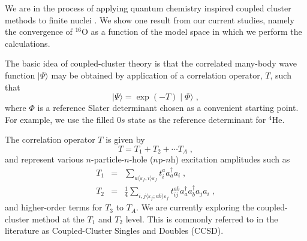 \documentclass[twoside,12pt]{article}
\begin{document}
We are in the process of applying quantum chemistry inspired coupled cluster
methods
\cite{comp_chem_rev00,cizek66,Bartlett95,Paldus99,Piecuch02a,Piecuch02b,cizek69,Stanton:1993,Piecuch99} to
finite nuclei \cite{dean03,kowalski03n}. We show one result
from our current studies, namely the convergence of $^{16}$O
as a function of the model space in which we perform the calculations.

The basic idea of coupled-cluster theory is that the correlated many-body
wave function $\mid \Psi\rangle$ 
may be obtained by application of a correlation operator, 
$T$, such that
\begin{equation}
\mid\Psi \rangle =\exp\left(-T\right)\mid\Phi\rangle\;,
\end{equation}
where $\Phi$ is a reference Slater determinant chosen as a convenient starting
point.  For example, we use the filled $0s$ state as the reference 
determinant for $^4$He.

The correlation operator $T$ is given by
\begin{equation}
T=T_1 + T_2 + \cdots T_A\;,
\end{equation}
and represent various
$n$-particle-$n$-hole ($n$p-$n$h) excitation amplitudes such as
\begin{eqnarray}
T_1 &=& \sum_{a\langle\varepsilon_f, i\rangle\varepsilon_f}t^a_i a^\dagger_a a_i\;, \\
T_2 &=& \frac{1}{4}\sum_{i,j\langle\varepsilon_f; ab \rangle \varepsilon_f}t^{ab}_{ij}
a^\dagger_a a^\dagger_b a_j a_i\;,
\end{eqnarray}
and higher-order terms for $T_3$ to $T_A$.  
We are currently exploring
the coupled-cluster method at the $T_1$ and $T_2$ level. This is 
commonly referred to in the literature as Coupled-Cluster Singles and
Doubles (CCSD). 
\end{document}
